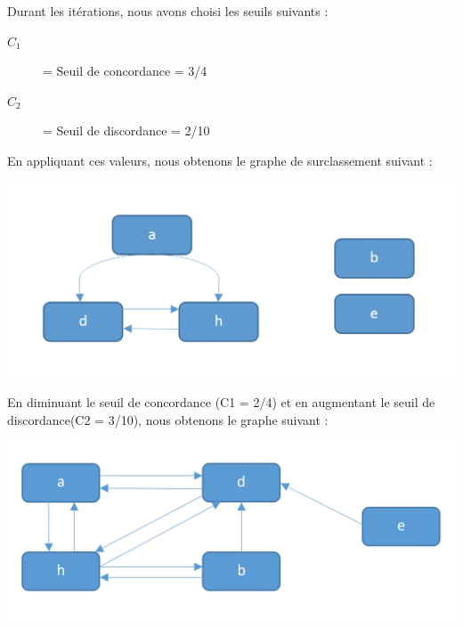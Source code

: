 \documentclass[12pt]{article}
\begin{document}
Durant les itérations, nous avons choisi les seuils suivants :
\begin{description}
\item[$C_{1}$] = Seuil de concordance = 3/4
\item[$C_{2}$] = Seuil de discordance = 2/10
\end{description}
En appliquant ces valeurs, nous obtenons le graphe de surclassement suivant : 
\begin{center}
\includegraphics[scale=1.5]{graphes/s_3sur4____v_2sur10}
\end{center}

En diminuant le seuil de concordance (C1 = 2/4) et en augmentant le seuil de discordance(C2 = 3/10), nous obtenons le graphe suivant : 
\begin{center}
\includegraphics[scale=1]{graphes/s_2sur4____v_3sur10}
\end{center}

\end{document}
